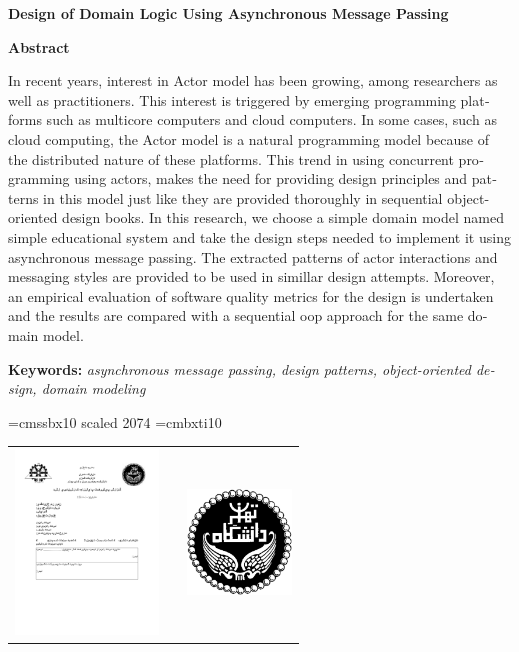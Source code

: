 \documentclass[oneside, a4paper,11pt]{book}
\numberwithin{equation}{chapter}
\numberwithin{table}{chapter}
\numberwithin{figure}{chapter}
\numberwithin{equation}{chapter}
\begin{document}
\begin{latin}
\pagestyle{empty}


\newpage
{\centering\Large{\bf{Design of  Domain Logic Using Asynchronous Message Passing }} \par}
{\centering\small{\bf{Abstract}} \par \vskip 1cm}
\noindent In recent years, interest in Actor model has been growing, among researchers as well as practitioners. This interest is triggered by emerging programming platforms such as multicore computers and cloud computers. In some cases, such as cloud computing, the Actor model is a natural programming model because of the distributed nature of these platforms. This trend in using concurrent programming using actors, makes the need for providing design principles and patterns in this model just like they are provided thoroughly in sequential  object-oriented design books.
In this research, we choose a simple domain model named simple educational system and take the design steps needed to implement it using asynchronous message passing. The extracted patterns of actor interactions and messaging styles are provided to be used in simillar design attempts. Moreover, an empirical evaluation of software quality metrics for the design is undertaken and the results are compared with a sequential oop approach for the same domain model.
{\par\vspace{5mm}}
\noindent\textbf{Keywords: }\textit{asynchronous message passing, design patterns, object-oriented design, domain modeling}

\newpage
\mbox{}


\font\titlefont=cmssbx10 scaled 2074
\font\supervisorfont=cmbxti10
\newpage
\thispagestyle{empty}
\begin{center}
\begin{tabular}{lp{7cm}r}
\includegraphics[width=3.8cm]{Figures/englogo} & & \includegraphics[width=2.8cm]{Figures/utlogo} \\
\end{tabular}


\end{center}
\end{latin}
\end{document}
